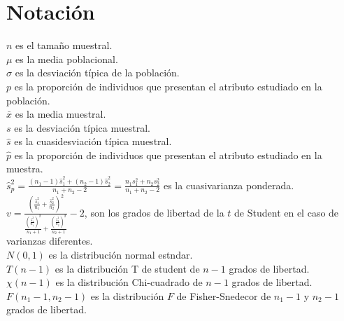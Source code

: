 \documentclass[a4paper,landscape]{article}
\begin{document}
\section*{Notación}
$n$ es el tamaño muestral.\\
$\mu$ es la media poblacional.\\
$\sigma$ es la desviación típica de la población.\\
$p$ es la proporción de individuos que presentan el atributo estudiado en la población.\\
$\bar{x}$ es la media muestral.\\
$s$ es la desviación típica muestral.\\
$\hat s$ es la cuasidesviación típica muestral.\\
$\hat{p}$ es la proporción de individuos que presentan el atributo estudiado en la muestra.\\
$\displaystyle \hat s^2_{p}=\frac{(n_{1}-1)\hat s^2_1+(n_{2}-1)\hat s^2_2}{n_{1}+n_{2}-2}=
\frac{n_{1}s^2_{1}+n_{2}s^2_{2}}{n_{1}+n_{2}-2}$ es la cuasivarianza ponderada.\\
$v=\frac{\left(\frac{\hat s^2_1}{n_{1}}+
          \frac{\hat s^2_2}{n_{2}}\right)^2}
         {\frac{\left(\frac{\hat s^2_1}{n_{1}}\right)^2}{n_{1}+1}+
          \frac{\left(\frac{\hat s^2_2}{n_{2}}\right)^2}{n_{2}+1}} -2$, son los
          grados de libertad de la $t$ de Student en el caso de varianzas
          diferentes.\\
$N(0,1)$ es la distribución normal estndar.\\
$T(n-1)$ es la distribución T de student de $n-1$ grados de libertad.\\
$\chi(n-1)$ es la distribución Chi-cuadrado de $n-1$ grados de libertad.\\
$F(n_{1}-1,n_{2}-1)$ es la distribución $F$ de Fisher-Snedecor de $n_1-1$ y $n_2-1$ grados de libertad.\\
\end{document}
